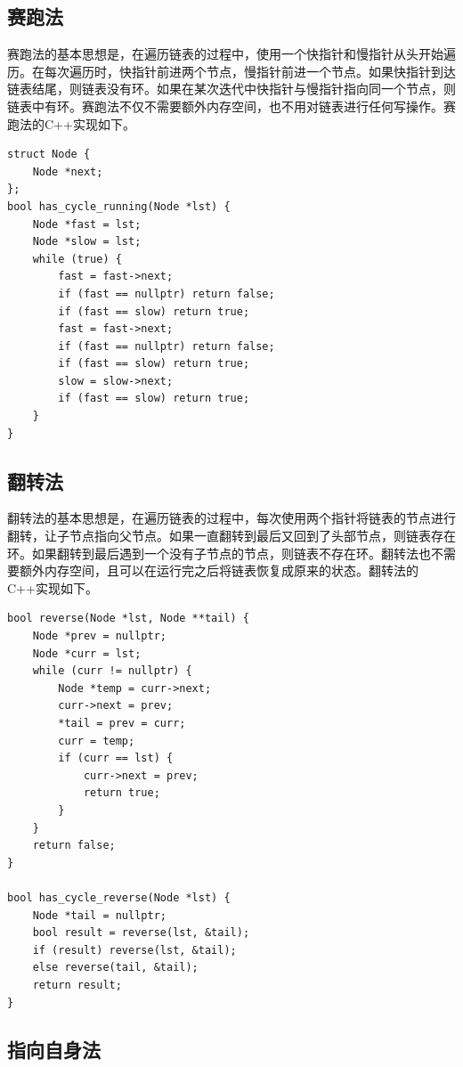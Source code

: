 \documentclass[UTF8]{ctexart}
\begin{document}
\subsection{赛跑法}

赛跑法的基本思想是，在遍历链表的过程中，使用一个快指针和慢指针从头开始遍历。在每次遍历时，快指针前进两个节点，慢指针前进一个节点。如果快指针到达链表结尾，则链表没有环。如果在某次迭代中快指针与慢指针指向同一个节点，则链表中有环。赛跑法不仅不需要额外内存空间，也不用对链表进行任何写操作。赛跑法的C++实现如下。

\begin{lstlisting}
struct Node {
    Node *next;
};
bool has_cycle_running(Node *lst) {
    Node *fast = lst;
    Node *slow = lst;
    while (true) {
        fast = fast->next;
        if (fast == nullptr) return false;
        if (fast == slow) return true;
        fast = fast->next;
        if (fast == nullptr) return false;
        if (fast == slow) return true;
        slow = slow->next;
        if (fast == slow) return true;
    }
}
\end{lstlisting}

\subsection{翻转法}

翻转法的基本思想是，在遍历链表的过程中，每次使用两个指针将链表的节点进行翻转，让子节点指向父节点。如果一直翻转到最后又回到了头部节点，则链表存在环。如果翻转到最后遇到一个没有子节点的节点，则链表不存在环。翻转法也不需要额外内存空间，且可以在运行完之后将链表恢复成原来的状态。翻转法的C++实现如下。

\begin{lstlisting}
bool reverse(Node *lst, Node **tail) {
    Node *prev = nullptr;
    Node *curr = lst;
    while (curr != nullptr) {
        Node *temp = curr->next;
        curr->next = prev;
        *tail = prev = curr;
        curr = temp;
        if (curr == lst) {
            curr->next = prev;
            return true;
        }
    }
    return false;
}

bool has_cycle_reverse(Node *lst) {
    Node *tail = nullptr;
    bool result = reverse(lst, &tail);
    if (result) reverse(lst, &tail);
    else reverse(tail, &tail);
    return result;
}
\end{lstlisting}

\subsection{指向自身法}
\end{document}
